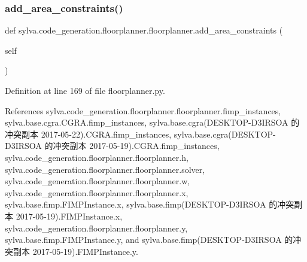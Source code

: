 \subsubsection{\texorpdfstring{add\+\_\+area\+\_\+constraints()}{add\_area\_constraints()}}
{\footnotesize\ttfamily def sylva.\+code\+\_\+generation.\+floorplanner.\+floorplanner.\+add\+\_\+area\+\_\+constraints (\begin{DoxyParamCaption}\item[{}]{self }\end{DoxyParamCaption})}



Definition at line 169 of file floorplanner.\+py.



References sylva.\+code\+\_\+generation.\+floorplanner.\+floorplanner.\+fimp\+\_\+instances, sylva.\+base.\+cgra.\+C\+G\+R\+A.\+fimp\+\_\+instances, sylva.\+base.\+cgra(\+D\+E\+S\+K\+T\+O\+P-\/\+D3\+I\+R\+S\+O\+A 的冲突副本 2017-\/05-\/22).\+C\+G\+R\+A.\+fimp\+\_\+instances, sylva.\+base.\+cgra(\+D\+E\+S\+K\+T\+O\+P-\/\+D3\+I\+R\+S\+O\+A 的冲突副本 2017-\/05-\/19).\+C\+G\+R\+A.\+fimp\+\_\+instances, sylva.\+code\+\_\+generation.\+floorplanner.\+floorplanner.\+h, sylva.\+code\+\_\+generation.\+floorplanner.\+floorplanner.\+solver, sylva.\+code\+\_\+generation.\+floorplanner.\+floorplanner.\+w, sylva.\+code\+\_\+generation.\+floorplanner.\+floorplanner.\+x, sylva.\+base.\+fimp.\+F\+I\+M\+P\+Instance.\+x, sylva.\+base.\+fimp(\+D\+E\+S\+K\+T\+O\+P-\/\+D3\+I\+R\+S\+O\+A 的冲突副本 2017-\/05-\/19).\+F\+I\+M\+P\+Instance.\+x, sylva.\+code\+\_\+generation.\+floorplanner.\+floorplanner.\+y, sylva.\+base.\+fimp.\+F\+I\+M\+P\+Instance.\+y, and sylva.\+base.\+fimp(\+D\+E\+S\+K\+T\+O\+P-\/\+D3\+I\+R\+S\+O\+A 的冲突副本 2017-\/05-\/19).\+F\+I\+M\+P\+Instance.\+y.


